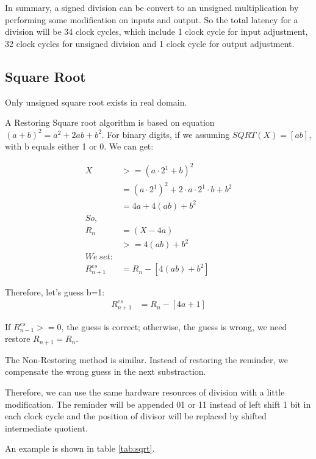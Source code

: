 In summary, a signed division can be convert to an unsigned multiplication by
performing some modification on inputs and output. So the total latency for a division
will be 34 clock cycles, which include 1 clock cycle for input adjustment, 32 clock cycles
for unsigned division and 1 clock cycle for output adjustment.

\subsection[Square Root]{Square Root}
Only unsigned square root exists in real domain.

A Restoring Square root algorithm is based on equation $(a+b)^2=a^2+2ab+b^2$. For binary
digits, if we assuming $SQRT(X)=[ab]$, with b equals either 1 or 0. We can
get:

\begin{align*}
X & >= (a\cdot 2^1+b)^2\\
  & = (a\cdot 2^1)^2+2\cdot a\cdot 2^1 \cdot b + b^2\\
  & = 4a + 4(ab) + b^2\\
So,\\
R_{n} & = (X-4a)\\
  & >= 4(ab) + b^2\\
We\ set:\\
R_{n+1}^{es} &= R_{n} - [4(ab) + b^2]
\end{align*}

Therefore, let's guess b=1:
\begin{align*}
R_{n+1}^{es} &= R_{n} - [4a + 1]
\end{align*}

If $R_{n-1}^{es}>=0$, the guess is correct; otherwise, the guess is wrong, we need
restore $R_{n+1}=R_{n}$.

The Non-Restoring method is similar. Instead of restoring the reminder, we compensate
the wrong guess in the next substraction.

Therefore, we can use the same hardware resources of division with a little modification. The reminder
will be appended 01 or 11 instead of left shift 1 bit in each clock cycle and the position of divisor
will be replaced by shifted intermediate quotient.

An example is shown in table \ref{tab:sqrt}.

